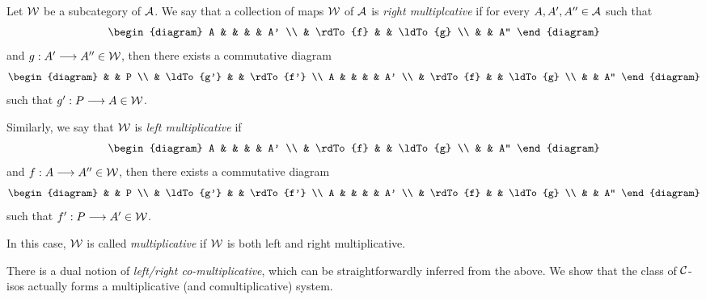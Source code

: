 \begin{definition}
Let $\mathcal{W}$ be a subcategory of $\mathcal{A}$. We say that a 
collection of maps $\mathcal{W}$ of $\mathcal{A}$ is \emph{right 
multiplcative} if for every $A, A', A'' \in \mathcal{A}$ such that
\[
\begin{diagram}
A &          &    &          & A' \\
  & \rdTo{f} &    & \ldTo{g} \\
  &          & A''
\end{diagram}
\]
and $g: A' \longrightarrow A'' \in \mathcal{W}$, then there exists a commutative
diagram
\[
\begin{diagram}
  &           & P  \\
  & \ldTo{g'} &    & \rdTo{f'} \\
A &           &    &           & A' \\
  & \rdTo{f}  &    & \ldTo{g}  \\
  &           & A''
\end{diagram}
\]
such that $g': P \longrightarrow A \in \mathcal{W}$. 

Similarly, we say that 
$\mathcal{W}$ is \emph{left multiplicative} if
\[
\begin{diagram}
A &          &    &          & A' \\
  & \rdTo{f} &    & \ldTo{g} \\
  &          & A''
\end{diagram}
\]
and $f: A \longrightarrow A'' \in \mathcal{W}$, then there exists a commutative 
diagram
\[
\begin{diagram}
  &           & P  \\
  & \ldTo{g'} &    & \rdTo{f'} \\
A &           &    &           & A' \\
  & \rdTo{f}  &    & \ldTo{g}  \\
  &           & A''
\end{diagram}
\]
such that $f': P \longrightarrow A' \in \mathcal{W}$.

In this case, $\mathcal{W}$ is called \emph{multiplicative} if 
$\mathcal{W}$ is both left and right multiplicative.
\end{definition}

There is a dual notion of \emph{left/right co-multiplicative},
which can be straightforwardly inferred from the above. We
show that the class of $\mathcal{C}$-isos actually forms a multiplicative
(and comultiplicative) system.

